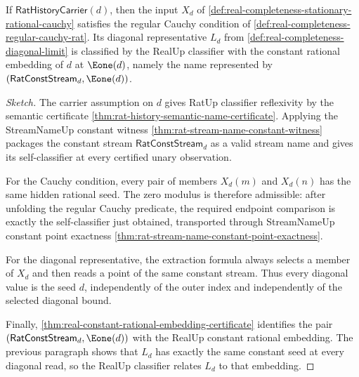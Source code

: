 \begin{theorem}
\label{thm:real-completeness-stationary-rational-diagonal}
If $\mathsf{RatHistoryCarrier}(d)$, then the input $X_d$ of \autoref{def:real-completeness-stationary-rational-cauchy} satisfies the regular Cauchy condition of \autoref{def:real-completeness-regular-cauchy-rat}. Its diagonal representative $L_d$ from \autoref{def:real-completeness-diagonal-limit} is classified by the RealUp classifier with the constant rational embedding of $d$ at $\Eone(d)$, namely the name represented by $(\mathsf{RatConstStream}_d,\Eone(d))$.
\end{theorem}

\begin{proof}[Sketch]
The carrier assumption on $d$ gives RatUp classifier reflexivity by the semantic certificate \autoref{thm:rat-history-semantic-name-certificate}. Applying the StreamNameUp constant witness \autoref{thm:rat-stream-name-constant-witness} packages the constant stream $\mathsf{RatConstStream}_d$ as a valid stream name and gives its self-classifier at every certified unary observation.

For the Cauchy condition, every pair of members $X_d(m)$ and $X_d(n)$ has the same hidden rational seed. The zero modulus is therefore admissible: after unfolding the regular Cauchy predicate, the required endpoint comparison is exactly the self-classifier just obtained, transported through StreamNameUp constant point exactness \autoref{thm:rat-stream-name-constant-point-exactness}.

For the diagonal representative, the extraction formula always selects a member of $X_d$ and then reads a point of the same constant stream. Thus every diagonal value is the seed $d$, independently of the outer index and independently of the selected diagonal bound.

Finally, \autoref{thm:real-constant-rational-embedding-certificate} identifies the pair $(\mathsf{RatConstStream}_d,\Eone(d))$ with the RealUp constant rational embedding. The previous paragraph shows that $L_d$ has exactly the same constant seed at every diagonal read, so the RealUp classifier relates $L_d$ to that embedding.
\end{proof}

